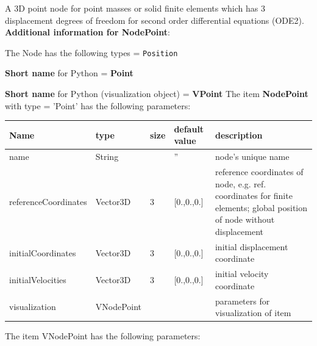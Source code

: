 
\newpage

\label{sec:item:NodePoint}
A 3D point node for point masses or solid finite elements which has 3 displacement degrees of freedom for second order differential equations (ODE2).\vspace{12pt}
 \\{\bf Additional information for NodePoint}:
\bi
  \item The Node has the following types = \texttt{Position}
  \item {\bf Short name} for Python = {\bf Point}  \item {\bf Short name} for Python (visualization object) = {\bf VPoint}\ei
\vspace{12pt} \noindent The item {\bf NodePoint} with type = 'Point' has the following parameters:\vspace{-1cm}\\ 
\begin{center}
  \footnotesize
  \begin{longtable}{| p{4.5cm} | p{2.5cm} | p{0.5cm} | p{2.5cm} | p{6cm} |}
    \hline
    \bf Name & \bf type & \bf size & \bf default value & \bf description \\ \hline
    name &     String &      &     '' &     node's unique name\\ \hline
    referenceCoordinates &     Vector3D &     3 &     [0.,0.,0.] &     reference coordinates of node, e.g. ref. coordinates for finite elements; global position of node without displacement\\ \hline
    initialCoordinates &     Vector3D &     3 &     [0.,0.,0.] &     initial displacement coordinate\\ \hline
    initialVelocities &     Vector3D &     3 &     [0.,0.,0.] &     initial velocity coordinate\\ \hline
    visualization & VNodePoint & & & parameters for visualization of item \\ \hline
	  \end{longtable}
	\end{center}
The item VNodePoint has the following parameters:\vspace{-1cm}\\ 
